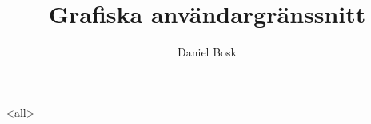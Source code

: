 \documentclass[ignoreframetext,compress]{beamer}
\begin{document}
\title{%
  Grafiska användargränssnitt
}
\author{Daniel Bosk}

\begin{frame}
  \maketitle
\end{frame}

\mode<all>

\mode*
%
\end{document}
